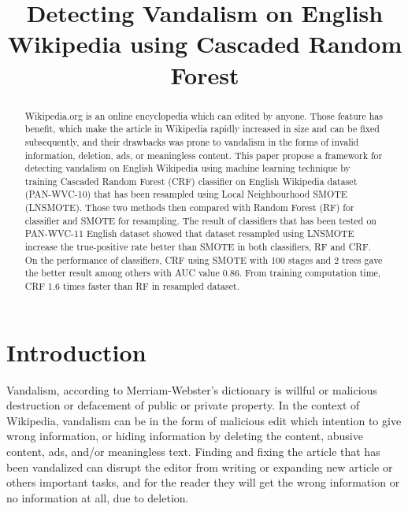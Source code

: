 \documentclass[conference,compsoc,a4paper,twocolumn,final]{IEEEtran}
\begin{document}

\title{Detecting Vandalism on English Wikipedia using Cascaded Random Forest}

\author{%
}

\maketitle



\begin{abstract}
Wikipedia.org is an online encyclopedia which can edited by anyone.
Those feature has benefit, which make the article in Wikipedia rapidly
increased in size and can be fixed subsequently, and their drawbacks was prone
to vandalism in the forms of invalid information, deletion, ads, or meaningless
content.
This paper propose a framework for detecting vandalism on English Wikipedia
using machine learning technique by training Cascaded Random Forest (CRF)
classifier on English Wikipedia dataset (PAN-WVC-10) that has been resampled
using Local Neighbourhood SMOTE (LNSMOTE).
Those two methods then compared with Random Forest (RF) for classifier and
SMOTE for resampling.
The result of classifiers that has been tested on PAN-WVC-11 English dataset
showed that dataset resampled using LNSMOTE increase the true-positive rate
better than SMOTE in both classifiers, RF and CRF.
On the performance of classifiers, CRF using SMOTE with 100 stages and 2 trees
gave the better result among others with AUC value 0.86.
From training computation time, CRF 1.6 times faster than RF in resampled
dataset.
\end{abstract}



\section{Introduction}
\label{section:introduction}

Vandalism, according to Merriam-Webster's dictionary is willful or malicious
destruction or defacement of public or private property.
In the context of Wikipedia, vandalism can be in the form of malicious edit
which intention to give wrong information, or hiding information by deleting
the content, abusive content, ads, and/or meaningless text.
Finding and fixing the article that has been vandalized can disrupt the editor
from writing or expanding new article or others important tasks, and for the
reader they will get the wrong information or no information at all, due to
deletion.
\end{document}

